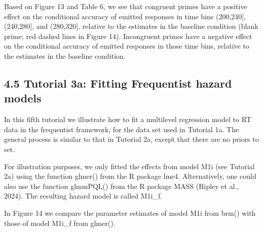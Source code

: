 \documentclass[
  man, donotrepeattitle,floatsintext]{apa6}
\begin{document}
\begin{center}
\begin{ThreePartTable}
\end{ThreePartTable}
\end{center}

Based on Figure 13 and Table 6, we see that congruent primes have a positive effect on the conditional accuracy of emitted responses in time bins (200,240{]}, (240,280{]}, and (280,320{]}, relative to the estimates in the baseline condition (blank prime; red dashed lines in Figure 14).
Incongruent primes have a negative effect on the conditional accuracy of emitted responses in those time bins, relative to the estimates in the baseline condition.

\subsection{4.5 Tutorial 3a: Fitting Frequentist hazard models}\label{tutorial-3a-fitting-frequentist-hazard-models}

In this fifth tutorial we illustrate how to fit a multilevel regression model to RT data in the frequentist framework, for the data set used in Tutorial 1a. The general process is similar to that in Tutorial 2a, except that there are no priors to set.

For illustration purposes, we only fitted the effects from model M1i (see Tutorial 2a) using the function glmer() from the R package lme4. Alternatively, one could also use the function glmmPQL() from the R package MASS (Ripley et al., 2024). The resulting hazard model is called M1i\_f.

In Figure 14 we compare the parameter estimates of model M1i from brm() with those of model M1i\_f from glmer().
\end{document}
